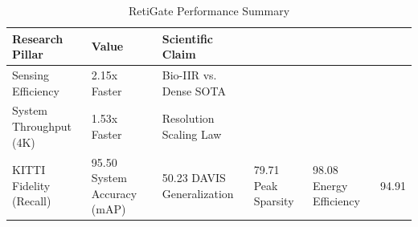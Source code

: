 \begin{table}
\caption{RetiGate Performance Summary}
\label{tab:results}
\begin{tabular}{lll}
\toprule
Research Pillar & Value & Scientific Claim \\
\midrule
Sensing Efficiency & 2.15x Faster & Bio-IIR vs. Dense SOTA \\
System Throughput (4K) & 1.53x Faster & Resolution Scaling Law \\
KITTI Fidelity (Recall) & 95.50%
System Accuracy (mAP) & 50.23%
DAVIS Generalization & 79.71%
Peak Sparsity & 98.08%
Energy Efficiency & 94.91%
\bottomrule
\end{tabular}
\end{table}

